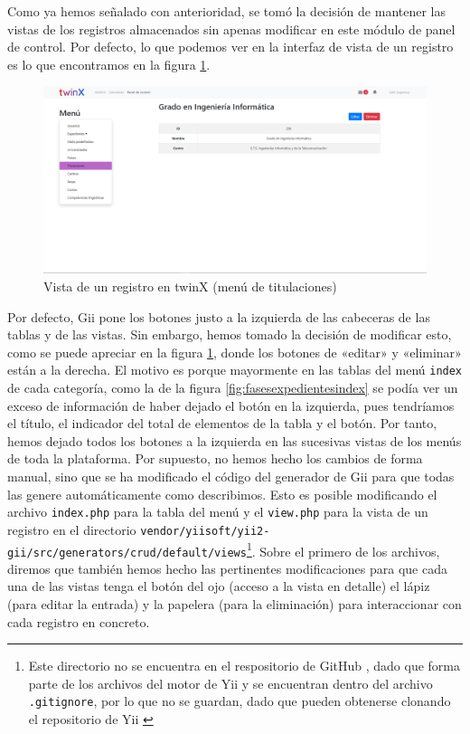 Como ya hemos señalado con anterioridad, se tomó la decisión de mantener las vistas de los registros almacenados sin apenas modificar en este módulo de panel de control. Por defecto, lo que podemos ver en la interfaz de vista de un registro es lo que encontramos en la figura \ref{fig:vistatitulaciontwinX}.

\begin{figure}
	\centering
	\includegraphics[width=\textwidth]{Capturas de twinX/vista_titulacion}
	\caption[Vista de un registro en twinX]{Vista de un registro en twinX (menú de titulaciones)}
	\label{fig:vistatitulaciontwinX}
\end{figure}

Por defecto, Gii pone los botones justo a la izquierda de las cabeceras de las tablas y de las vistas. Sin embargo, hemos tomado la decisión de modificar esto, como se puede apreciar en la figura \ref{fig:vistatitulaciontwinX}, donde los botones de «editar» y «eliminar» están a la derecha. El motivo es porque mayormente en las tablas del menú \texttt{index} de cada categoría, como la de la figura \ref{fig:fasesexpedientesindex} se podía ver un exceso de información de haber dejado el botón en la izquierda, pues tendríamos el título, el indicador del total de elementos de la tabla y el botón. Por tanto, hemos dejado todos los botones a la izquierda en las sucesivas vistas de los menús de toda la plataforma. Por supuesto, no hemos hecho los cambios de forma manual, sino que se ha modificado el código del generador de Gii para que todas las genere automáticamente como describimos. Esto es posible modificando el archivo \texttt{index.php} para la tabla del menú y el \texttt{view.php} para la vista de un registro en el directorio \texttt{vendor/yiisoft/yii2-gii/src/generators/crud/default/views}\footnote{Este directorio no se encuentra en el respositorio de GitHub \cite{repogit}, dado que forma parte de los archivos del motor de Yii y se encuentran dentro del archivo \texttt{.gitignore}, por lo que no se guardan, dado que pueden obtenerse clonando el repositorio de Yii \cite{yii2advanced}}. Sobre el primero de los archivos, diremos que también hemos hecho las pertinentes modificaciones para que cada una de las vistas tenga el botón del ojo (acceso a la vista en detalle) el lápiz (para editar la entrada) y la papelera (para la eliminación) para interaccionar con cada registro en concreto.

